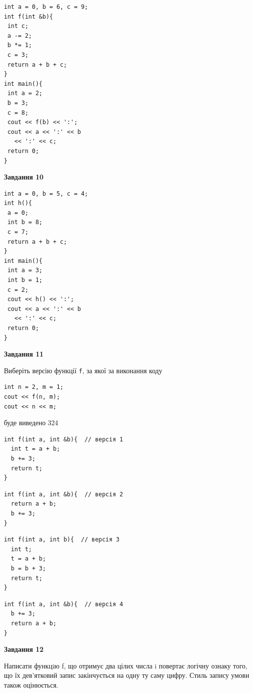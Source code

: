 \documentclass[12pt, ukrainian]{article}
\def\code#1{\Verb!#1!}
\begin{document}
{\begin {large}
\begin{minipage}[t]{7.0cm}
\begin{verbatim}
int a = 0, b = 6, c = 9;
int f(int &b){
 int c;
 a -= 2;
 b *= 1;
 c = 3;
 return a + b + c;
}
int main(){
 int a = 2;
 b = 3;
 c = 8;
 cout << f(b) << ':';
 cout << a << ':' << b 
   << ':' << c;
 return 0;
}
\end{verbatim}



\begin{center}
\textbf{Завдання 10}
\end{center}
\vspace{-8mm}

\begin{verbatim}
int a = 0, b = 5, c = 4;
int h(){
 a = 0;
 int b = 8;
 c = 7;
 return a + b + c;
}
int main(){
 int a = 3;
 int b = 1;
 c = 2;
 cout << h() << ':';
 cout << a << ':' << b 
   << ':' << c;
 return 0;
}
\end{verbatim}

\end{minipage}
\vline \hspace{1mm}
\begin{minipage}[t]{11.0cm}

\begin{center}
\textbf{Завдання 11}
\end{center}
Виберіть версію функції \code{f}, за якої за виконання коду
\begin{verbatim}
int n = 2, m = 1;
cout << f(n, m);
cout << n << m;
\end{verbatim}

буде виведено 324

\begin{verbatim}
int f(int a, int &b){  // версія 1
  int t = a + b;
  b += 3;
  return t;
}
\end{verbatim}

\vspace{-8mm}\begin{verbatim}
int f(int a, int &b){  // версія 2
  return a + b;
  b += 3;
}
\end{verbatim}

\vspace{-8mm}\begin{verbatim}
int f(int a, int b){  // версія 3
  int t;
  t = a + b;
  b = b + 3;
  return t;
}
\end{verbatim}

\vspace{-8mm}\begin{verbatim}
int f(int a, int &b){  // версія 4
  b += 3;
  return a + b;
}
\end{verbatim}



\begin{center}
\textbf{Завдання 12}
\end{center}

Написати функцiю f, що отримує два цілих числа i повертає логічну ознаку того, що їх дев'ятковий запис закінчується на одну ту саму цифру. Стиль запису умови також оцінюється.\par

\end{minipage}

\end {large}}
\end{document}
